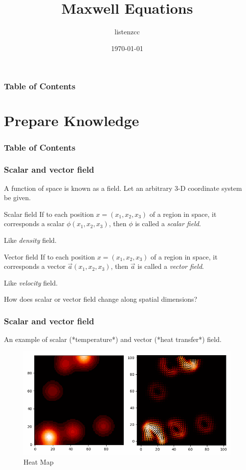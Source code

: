 \documentclass{beamer}
\title{Maxwell Equations}
\author{listenzcc}
\institute[VFU] %
{
  \inst{1}%
  Faculty of Physics\\
  Very Famous University
  \and
  \inst{2}%
  Faculty of Chemistry\\
  Very Famous University
}
\date{\today}
\begin{document}
\frame{\titlepage}

\begin{frame}
    \frametitle{Table of Contents}
    \tableofcontents
\end{frame}


\section{Prepare Knowledge}
\begin{frame}
    \frametitle{Table of Contents}
    \tableofcontents[currentsection]
\end{frame}

\begin{frame}
    \frametitle{Scalar and vector field}
    A function of space is known as a field.
    Let an arbitrary 3-D coordinate system be given.

    \begin{block}{Scalar field}
        If to each position $x = (x_{1}, x_{2}, x_{3})$ of a region in space, it corresponds a scalar $\phi (x_{1}, x_{2}, x_{3})$, then $\phi$ is called a \emph{scalar field}.

        Like \emph{density} field.
    \end{block}

    \begin{block}{Vector field}
        If to each position $x = (x_{1}, x_{2}, x_{3})$ of a region in space, it corresponds a vector $\vec{a} (x_{1}, x_{2}, x_{3})$, then $\vec{a}$ is called a \emph{vector field}.

        Like \emph{velocity} field.
    \end{block}

    How does scalar or vector field change along spatial dimensions?
\end{frame}

\begin{frame}
    \frametitle{Scalar and vector field}
    An example of scalar (*temperature*) and vector (*heat transfer*) field.
    \begin{figure}[H]
        \centering
        \includegraphics[height=0.5\textheight]{heatmap.png}
        \caption{Heat Map}
        \label{fig: Heat map}
    \end{figure}
\end{frame}
\end{document}
